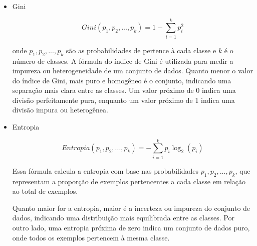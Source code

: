 \documentclass[12pt,a4paper, brazil]{article}
\begin{document}
\begin{itemize}
    \item Gini
    
        \begin{equation}
            Gini(p_1, p_2, ..., p_k) = 1 - \sum_{i=1}^{k} p_i^2
        \end{equation}
            
        onde $p_1, p_2, ..., p_k$ são as probabilidades de pertence à cada classe e $k$ é o número de classes. A fórmula do índice de Gini é utilizada para medir a impureza ou heterogeneidade de um conjunto de dados. Quanto menor o valor do índice de Gini, mais puro e homogêneo é o conjunto, indicando uma separação mais clara entre as classes. Um valor próximo de 0 indica uma divisão perfeitamente pura, enquanto um valor próximo de 1 indica uma divisão impura ou heterogênea.

        \item Entropia 
    
        \[
        Entropia(p_1, p_2, ..., p_k) = - \sum_{i=1}^{k} p_i \log_2(p_i)
        \]
            
        Essa fórmula calcula a entropia com base nas probabilidades $p_1, p_2, ..., p_k$, que representam a proporção de exemplos pertencentes a cada classe em relação ao total de exemplos.

        Quanto maior for a entropia, maior é a incerteza ou impureza do conjunto de dados, indicando uma distribuição mais equilibrada entre as classes. Por outro lado, uma entropia próxima de zero indica um conjunto de dados puro, onde todos os exemplos pertencem à mesma classe.
    
\end{itemize}
\end{document}
